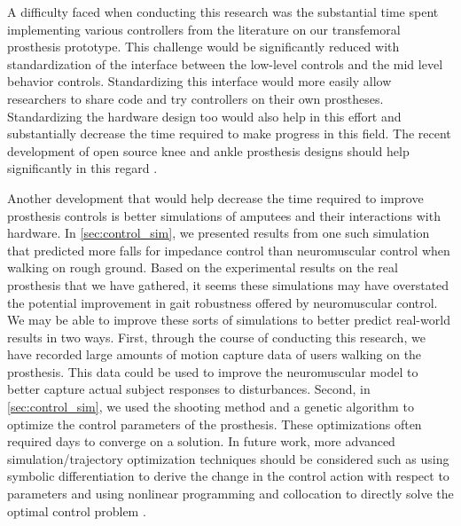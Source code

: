 A difficulty faced when conducting this research was the substantial time spent
implementing various controllers from the literature on our transfemoral
prosthesis prototype.  This challenge would be significantly reduced with
standardization of the interface between the low-level controls and the mid
level behavior controls. Standardizing this interface would more easily allow
researchers to share code and try controllers on their own prostheses.
Standardizing the hardware design too would also help in this effort and
substantially decrease the time required to make progress in this field. The
recent development of open source knee and ankle prosthesis designs should help
significantly in this regard \citep{azocar2018design}.

Another development that would help decrease the time required to improve
prosthesis controls is better simulations of amputees and their interactions
with hardware. In \cref{sec:control_sim}, we presented results from one such
simulation that predicted more falls for impedance control than neuromuscular
control when walking on rough ground. Based on the experimental results on the
real prosthesis that we have gathered, it seems these simulations may have
overstated the potential improvement in gait robustness offered by neuromuscular
control. We may be able to improve these sorts of simulations to better predict
real-world results in two ways. First, through the course of conducting this
research, we have recorded large amounts of motion capture data of users walking
on the prosthesis. This data could be used to improve the neuromuscular model to
better capture actual subject responses to disturbances. Second, in
\cref{sec:control_sim}, we used the shooting method and a genetic algorithm
\citep{hansen2006cma} to optimize the control parameters of the prosthesis.
These optimizations often required days to converge on a solution. In future
work, more advanced simulation/trajectory optimization techniques should be
considered such as using symbolic differentiation to derive the change in the
control action with respect to parameters and using nonlinear programming and
collocation to directly solve the optimal control problem
\citep{hargraves1987direct}. 


